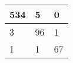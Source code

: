 \begin{tabular}{lll}
\hline
  534 & 5 & 0 \\
\hline
  3 & 96 & 1 \\
\hline
  1 & 1 & 67 \\
\hline
\end{tabular}
